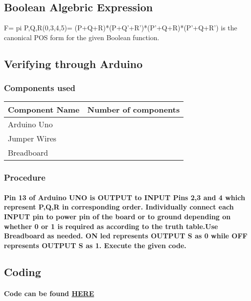 \documentclass{article}
\begin{document}
\subsection*{Boolean Algebric Expression}
F= pi P,Q,R(0,3,4,5)= (P+Q+R)*(P+Q'+R')*(P'+Q+R)*(P'+Q+R')
is the canonical POS form for the given Boolean function.
\vspace{40px}
\\
\subsection*{Verifying through Arduino}
\subsubsection*{Components used}
\vspace{10px}
\begin{tabularx}{0.8\textwidth} { 
  | >{\centering\arraybackslash}X | 
  | >{\centering\arraybackslash}X  |
  }
 \hline
 Component Name & Number of components \\
 \hline
 Arduino Uno  & 1  \\
\hline
Jumper Wires  & 6  \\
\hline
Breadboard  & 1 \\
\hline
\end{tabularx}
\subsubsection*{Procedure}
\paragraph{Pin 13 of Arduino UNO is OUTPUT to INPUT Pins 2,3 and 4 which represent P,Q,R in corresponding order. Individually connect each INPUT pin to power pin of the board or to ground depending on whether 0 or 1 is required as according to the truth table.Use Breadboard as needed. ON led represents OUTPUT S as 0 while OFF represents OUTPUT S as 1. Execute the given code. }
\subsection*{Coding}
\paragraph{Code can be found \href {https://raw.githubusercontent.com/drigas7/avr-gcc/main/codes/main.c}{HERE}
}
\begin{Center}
\mbox{}
\vfill
{}
\end{Center}
\end{document}
